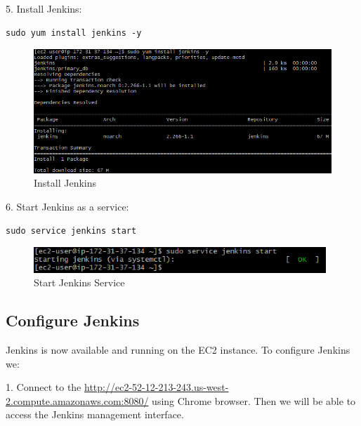 \documentclass[12pt,a4paper,twoside]{article}
\begin{document}
5. Install Jenkins:


\begin{verbatim}
sudo yum install jenkins -y
\end{verbatim}


\begin{figure}[H]
    \centering
        \includegraphics[width=15cm]{images-aws/18-install-jenkins.png}
        \caption{Install Jenkins}
\end{figure}


6. Start Jenkins as a service:


\begin{verbatim}
sudo service jenkins start
\end{verbatim}


\begin{figure}[H]
    \centering
        \includegraphics[width=11cm]{images-aws/19-start-jenkins.png}
        \caption{Start Jenkins Service}
\end{figure}



\newpage

\subsection{Configure Jenkins}


Jenkins is now available and running on the EC2 instance. To configure Jenkins we:


1. Connect to the \url{http://ec2-52-12-213-243.us-west-2.compute.amazonaws.com:8080/} using Chrome browser.
Then we will be able to access the Jenkins management interface.
\end{document}
